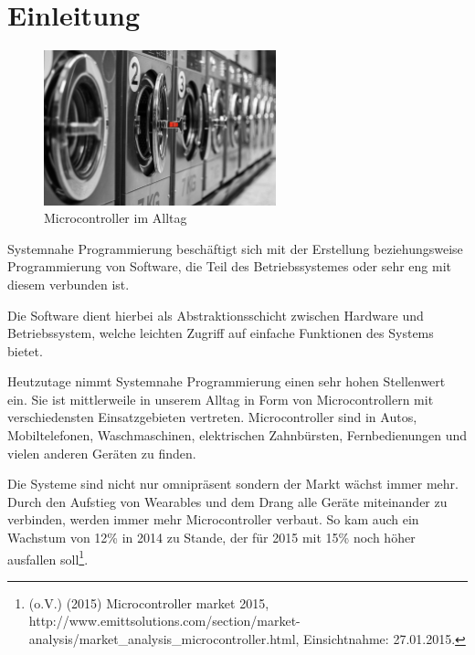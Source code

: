 
\chapter{Einleitung}\label{einleitung}

\begin{figure}[htbp]
\centering
\includegraphics[width=0.6\textwidth]{images/washing-maschine}
\caption{Microcontroller im Alltag\footnotemark}
\end{figure}

Systemnahe Programmierung beschäftigt sich mit der Erstellung
beziehungsweise Programmierung von Software, die Teil des
Betriebssystemes oder sehr eng mit diesem verbunden ist.

Die Software dient hierbei als Abstraktionsschicht zwischen Hardware und
Betriebssystem, welche leichten Zugriff auf einfache Funktionen des
Systems bietet.

Heutzutage nimmt Systemnahe Programmierung einen sehr hohen Stellenwert
ein. Sie ist mittlerweile in unserem Alltag in Form von Microcontrollern
mit verschiedensten Einsatzgebieten vertreten. Microcontroller sind in
Autos, Mobiltelefonen, Waschmaschinen, elektrischen Zahnbürsten,
Fernbedienungen und vielen anderen Geräten zu finden.

Die Systeme sind nicht nur omnipräsent sondern der Markt wächst immer
mehr. Durch den Aufstieg von Wearables und dem Drang alle Geräte
miteinander zu verbinden, werden immer mehr Microcontroller verbaut. So
kam auch ein Wachstum von 12\% in 2014 zu Stande, der für 2015 mit 15\%
noch höher ausfallen soll\footnote{(o.V.) (2015) Microcontroller market
  2015,
  http://www.emittsolutions.com/section/market-analysis/market\_analysis\_microcontroller.html,
  Einsichtnahme: 27.01.2015.}.
